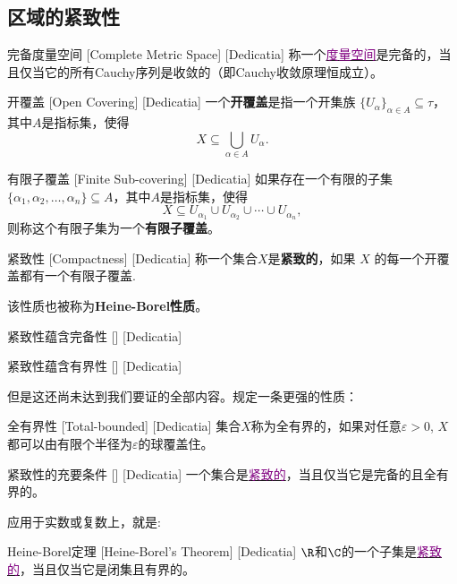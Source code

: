 \documentclass[UTF8]{ctexart}
\newcommand{\hyperrefc}[2]{\hyperref[#1]{\textcolor{purple}{#2}}}
\begin{document}
\subsection{区域的紧致性}
\begin{dfn}
    [UUID]
    {完备度量空间}
    [Complete Metric Space]
    [Dedicatia]
    称一个\hyperrefc{dfn:MetricSpace}{度量空间}是完备的，当且仅当它的所有Cauchy序列是收敛的（即Cauchy收敛原理恒成立）。
\end{dfn}
\begin{dfn}
    [UUID]
    {开覆盖}
    [Open Covering]
    [Dedicatia]
    一个\textbf{开覆盖}是指一个开集族 \( \{U_\alpha\}_{\alpha \in A} \subseteq \tau \)，其中$A$是指标集，使得
    \[X \subseteq \bigcup_{\alpha \in A} U_\alpha.\]
\end{dfn}
\begin{dfn}
    [UUID]
    {有限子覆盖}
    [Finite Sub-covering]
    [Dedicatia]
    如果存在一个有限的子集 \( \{\alpha_1, \alpha_2, \ldots, \alpha_n\} \subseteq A \)，其中$A$是指标集，使得
    \[X \subseteq U_{\alpha_1} \cup U_{\alpha_2} \cup \cdots \cup U_{\alpha_n},\]
    则称这个有限子集为一个\textbf{有限子覆盖}。
\end{dfn}
\begin{dfn}
    [UUID]
    {紧致性\label{dfn:Compactness}}
    [Compactness]
    [Dedicatia]
    称一个集合$X$是\textbf{紧致的}，如果 \(X\) 的每一个开覆盖都有一个有限子覆盖.
\end{dfn}
该性质也被称为\textbf{Heine-Borel性质}。
\begin{thm}
    [UUID]
    {紧致性蕴含完备性}
    []
    [Dedicatia]
\end{thm}
\begin{thm}
    [UUID]
    {紧致性蕴含有界性}
    []
    [Dedicatia]
\end{thm}
但是这还尚未达到我们要证的全部内容。规定一条更强的性质：
\begin{dfn}
    [UUID]
    {全有界性}
    [Total-bounded]
    [Dedicatia]
    集合$X$称为全有界的，如果对任意$\varepsilon>0$, $X$都可以由有限个半径为$\varepsilon$的球覆盖住。
\end{dfn}
\begin{thm}
    [UUID]
    {紧致性的充要条件}
    []
    [Dedicatia]
    一个集合是\hyperrefc{dfn:Compactness}{紧致的}，当且仅当它是完备的且全有界的。
\end{thm}
应用于实数或复数上，就是:
\begin{xmp}
    [UUID]
    {Heine-Borel定理}
    [Heine-Borel's Theorem]
    [Dedicatia]
    $\R$和$\C$的一个子集是\hyperrefc{dfn:Compactness}{紧致的}，当且仅当它是闭集且有界的。
\end{xmp}
\end{document}
